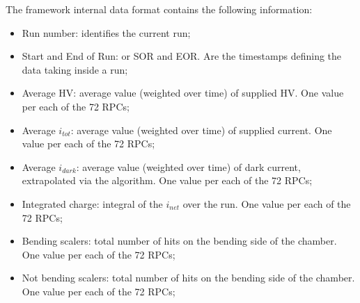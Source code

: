 The framework internal data format contains the following information:
\begin{itemize}
\item Run number: identifies the current run;
\item Start and End of Run: or SOR and EOR. Are the timestamps defining the data taking inside a run;
\item Average HV: average value (weighted over time) of supplied HV. One value per each of the 72 RPCs;
\item Average $i_{tot}$: average value (weighted over time) of supplied current.  One value per each of the 72 RPCs;
\item Average $i_{dark}$: average value (weighted over time) of dark current, extrapolated via the algorithm.  One value per each of the 72 RPCs;
\item Integrated charge: integral of the $i_{net}$ over the run.  One value per each of the 72 RPCs;
\item Bending scalers: total number of hits on the bending side of the chamber.  One value per each of the 72 RPCs;
\item Not bending scalers: total number of hits on the bending side of the chamber.  One value per each of the 72 RPCs;
\end{itemize}


